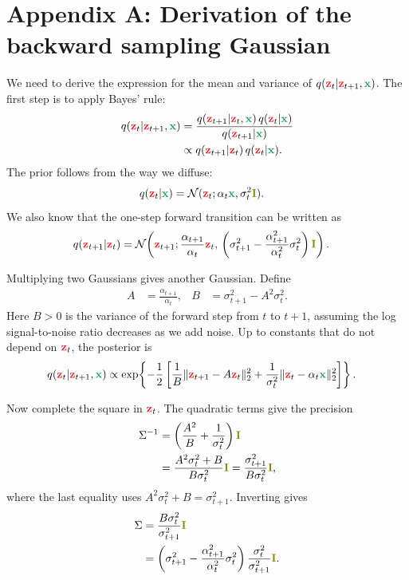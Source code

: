 \documentclass[usenames,dvipsnames]{article}
\DeclarePairedDelimiter{\norm}{\lVert}{\rVert}
\newcommand{\myvec}[1]{\mathbf{#1}}
\newcommand{\vx}{\myvec{\textcolor{ForestGreen}{x}}}
\newcommand{\vz}{\myvec{\textcolor{Red}{z}}}
\newcommand{\vI}{\myvec{\textcolor{olive}{I}}}
\newcommand{\gauss}{\mathcal{N}}
\begin{document}
\newpage
\section*{Appendix A: Derivation of the backward sampling Gaussian}

We need to derive the expression for the mean and variance of $q(\vz_{t} | \vz_{t+1}, \vx)$. The first step is to apply Bayes' rule:
\begin{align}
q(\vz_{t} | \vz_{t+1}, \vx)
&=
\frac{
    q(\vz_{t+1} | \vz_t, \vx)\,
    q(\vz_t | \vx)
}{
    q(\vz_{t+1} | \vx)
}
\nonumber \\
&\propto
q(\vz_{t+1} | \vz_t)\,
q(\vz_t | \vx).
\end{align}
The prior follows from the way we diffuse:
\begin{align}
q(\vz_t | \vx)
&=
\gauss(\vz_t;\alpha_t \vx, \sigma_t^2 \vI).
\end{align}
We also know that the one-step forward transition can be written as
\begin{align}
q(\vz_{t+1} | \vz_t)
&=
\gauss\!\left(
    \vz_{t+1};
    \frac{\alpha_{t+1}}{\alpha_t}\vz_t,\,
    \left(
        \sigma_{t+1}^2
        -
        \frac{\alpha_{t+1}^2}{\alpha_t^2}\sigma_t^2
    \right)\vI
\right).
\end{align}

Multiplying two Gaussians gives another Gaussian.  Define
\begin{align}
A &= \frac{\alpha_{t+1}}{\alpha_t},
&
B &= \sigma_{t+1}^2 - A^2\sigma_t^2 .
\end{align}
Here $B>0$ is the variance of the forward step from $t$ to $t+1$, assuming the log signal-to-noise ratio decreases as we add noise.  Up to constants that do not depend on $\vz_t$, the posterior is
\begin{align}
q(\vz_{t} | \vz_{t+1}, \vx)
&\propto
\exp\!\left\{
-\frac{1}{2}
\left[
    \frac{1}{B}
    \norm{\vz_{t+1}-A\vz_t}_2^2
    +
    \frac{1}{\sigma_t^2}
    \norm{\vz_t-\alpha_t\vx}_2^2
\right]
\right\}.
\end{align}

Now complete the square in $\vz_t$.  The quadratic terms give the precision
\begin{align}
\Sigma^{-1}
&=
\left(
    \frac{A^2}{B}
    +
    \frac{1}{\sigma_t^2}
\right)\vI
\nonumber \\
&=
\frac{A^2\sigma_t^2+B}{B\sigma_t^2}\vI
=
\frac{\sigma_{t+1}^2}{B\sigma_t^2}\vI,
\end{align}
where the last equality uses $A^2\sigma_t^2+B=\sigma_{t+1}^2$.  Inverting gives
\begin{align}
\Sigma
&=
\frac{B\sigma_t^2}{\sigma_{t+1}^2}\vI
\nonumber \\
&=
\left(
    \sigma_{t+1}^2
    -
    \frac{\alpha_{t+1}^2}{\alpha_t^2}\sigma_t^2
\right)
\frac{\sigma_t^2}{\sigma_{t+1}^2}\vI .
\end{align}
\end{document}
